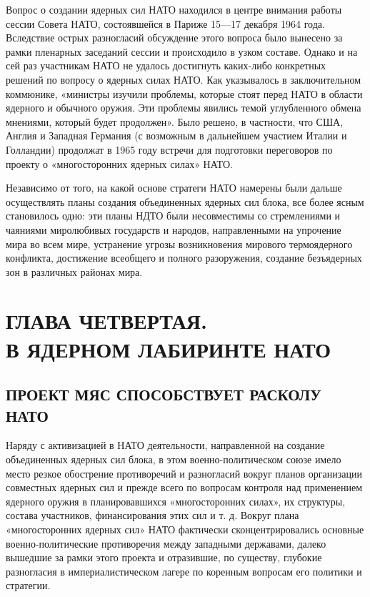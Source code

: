 \documentclass[12pt, a4paper, openany]{book}
\begin{document}
		Вопрос о создании ядерных сил НАТО находился в центре внимания работы сессии Совета НАТО, состоявшейся в Париже 15—17 декабря 1964 года. Вследствие острых разногласий обсуждение этого вопроса было вынесено за рамки пленарных заседаний сессии и происходило в узком составе. Однако и на сей раз участникам НАТО не удалось достигнуть каких-либо конкретных решений по вопросу о ядерных силах НАТО. Как указывалось в заключительном коммюнике, «министры изучили проблемы, которые стоят перед НАТО в области ядерного и обычного оружия. Эти проблемы явились темой углубленного обмена мнениями, который будет продолжен». Было решено, в частности, что США, Англия и Западная Германия (с возможным в дальнейшем участием Италии и Голландии) продолжат в 1965 году встречи для подготовки переговоров по проекту о «многосторонних ядерных силах» НАТО.
		
		Независимо от того, на какой основе стратеги НАТО намерены были дальше осуществлять планы создания объединенных ядерных сил блока, все более ясным становилось одно: эти планы НДТО были несовместимы со стремлениями и чаяниями миролюбивых государств и народов, направленными на упрочение мира во всем мире, устранение угрозы возникновения мирового термоядерного конфликта, достижение всеобщего и полного разоружения, создание безъядерных зон в различных районах мира.
		
		\newpage
		\section[Глава четвертая. В ЯДЕРНОМ ЛАБИРИНТЕ НАТО]{\center ГЛАВА ЧЕТВЕРТАЯ.\\ \textbf{В ЯДЕРНОМ ЛАБИРИНТЕ НАТО}}	
		\subsection[Проект МЯС способствует расколу НАТО]{\center ПРОЕКТ МЯС СПОСОБСТВУЕТ РАСКОЛУ НАТО}	
		
		Наряду с активизацией в НАТО деятельности, направленной на создание объединенных ядерных сил блока, в этом военно-политическом союзе имело место резкое обострение противоречий и разногласий вокруг планов организации совместных ядерных сил и прежде всего по вопросам контроля над применением ядерного оружия в планировавшихся «многосторонних силах», их структуры, состава участников, финансирования этих сил и т. д. Вокруг плана «многосторонних ядерных сил» НАТО фактически сконцентрировались основные военно-политические противоречия между западными державами, далеко вышедшие за рамки этого проекта и отразившие, по существу, глубокие разногласия в империалистическом лагере по коренным вопросам его политики и стратегии.
		
\end{document}

